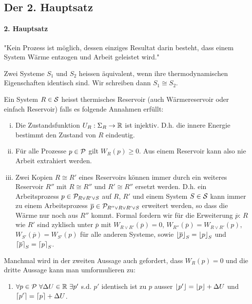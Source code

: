 \subsection{Der 2. Hauptsatz}

\paragraph{2. Hauptsatz}
"Kein Prozess ist möglich, dessen einziges Resultat darin besteht, dass einem
System Wärme entzogen und Arbeit geleistet wird."

\begin{definition}
    Zwei Systeme $S_1$ und $S_2$ heissen äquivalent, wenn ihre thermodynamischen
    Eigenschaften identisch sind. Wir schreiben dann $S_1 \cong S_2$.
\end{definition}

\begin{definition}
    Ein System $R \in \S$ heisst thermisches Reservoir (auch Wärmereservoir
    oder einfach Reservoir) falls es folgende Annahmen erfüllt:
    \begin{enumerate}[(i)]
        \item Die Zustandsfunktion $U_R : \Sigma_R \rightarrow \R$ ist injektiv.
            D.h. die innere Energie bestimmt den Zustand von $R$ eindeutig.
        \item Für alle Prozesse $p \in \P$ gilt $W_R(p) \geq 0$. Aus einem
            Reservoir kann also nie Arbeit extrahiert werden.
        \item Zwei Kopien $R \cong R'$ eines Reservoirs können immer durch ein
            weiteres Reservoir $R''$ mit $R \cong R''$ und $R' \cong R''$ ersetzt
            werden. D.h. ein Arbeitsprozess $p \in \P_{R \vee R' \vee S}$ auf $R$,
            $R'$ und einem System $S \in \S$ kann immer zu einem Arbeitsprozess
            $\overline{p} \in \P_{R'' \vee R \vee R' \vee S}$ erweitert werden, so
            dass die Wärme nur noch aus $R''$ kommt. Formal fordern wir für die
            Erweiterung $\overline{p}$: $R$ wie $R'$ sind zyklisch unter $\overline{p}$
            mit $W_{R \vee R'} (\overline{p}) = 0$, $W_{R''} (\overline{p}) = W_{R \vee R'} (p)$,
            $W_{S'} (\overline{p}) = W_{S'} (p)$ für alle anderen Systeme, sowie
            $\floor{\overline{p}}_S = \floor{p}_S$ und $\ceil{\overline{p}}_S =
            \ceil{p}_S$.
    \end{enumerate}
    Manchmal wird in der zweiten Aussage auch gefordert, dass $W_R(p) = 0$ und
    die dritte Aussage kann man umformulieren zu:
    \begin{enumerate}[]
        \item $\forall p \in \P \ \forall \Delta U \in \R \ \exists p'$ s.d.
            $p'$ identisch ist zu $p$ ausser $\floor{p'} = \floor{p} + \Delta U$
            und $\ceil{p'} = \ceil{p} + \Delta U$.
    \end{enumerate}
\end{definition}

